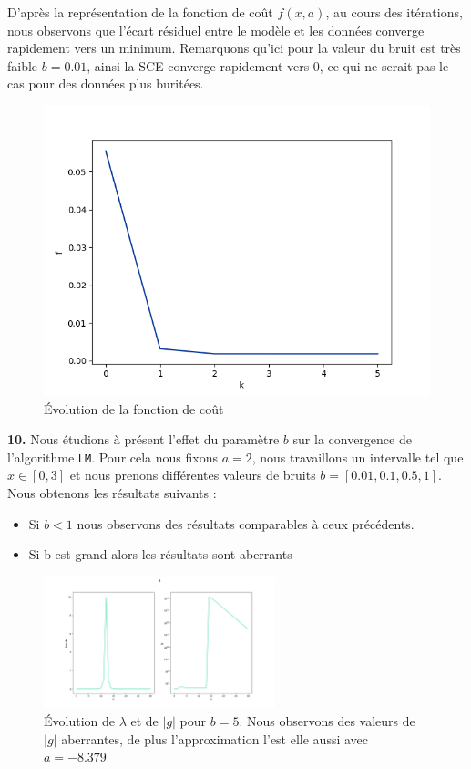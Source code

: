 \documentclass[12pt]{article}
\begin{document}
\begin{minipage}{0.5\textwidth}
D'après la représentation de la fonction de coût $f(x,a)$, au cours des itérations, nous observons que l'écart résiduel entre le modèle et les données  converge rapidement vers un minimum. 
Remarquons qu'ici pour la valeur du bruit est très faible $b=0.01$, ainsi la SCE  converge rapidement vers 0, ce qui ne serait pas le cas pour des données plus buritées.
\end{minipage} \hfill
\begin{minipage}{0.45\textwidth}
\begin{figure}[H]
\includegraphics[width=1\textwidth]{Figure_5.png}
\caption{Évolution de la fonction de coût}
\label{Fig1}
\end{figure}
\end{minipage}


\textbf{\color{brick}10.} Nous étudions à présent  l'effet du paramètre $b$ sur la convergence de l'algorithme \verb|LM|. Pour cela nous fixons $a=2$, nous travaillons un intervalle tel que $x \in [0,3]$ et nous prenons différentes valeurs de bruits $b=[0.01, 0.1 , 0.5 , 1]$. Nous obtenons les résultats suivants : 
\begin{itemize}
    \item Si $b<1$ nous observons des résultats comparables à ceux précédents.
    \item Si b est grand alors les résultats sont aberrants
\end{itemize}


\begin{figure}[H]
\centering
\includegraphics[width=0.6\textwidth]{Q10_Aberant.png}
\caption{ Évolution de $\lambda$ et de $|g|$ pour $b=5$. Nous observons des valeurs de $|g|$ aberrantes, de plus l'approximation l'est elle aussi avec $a=-8.379$}
\label{FigQ10}
\end{figure}
\end{document}
